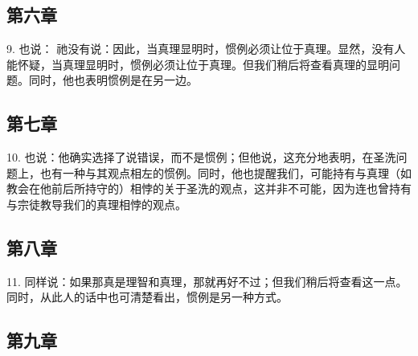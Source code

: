 
\subsection{第六章}

9. 也说：  祂没有说：因此，当真理显明时，惯例必须让位于真理。显然，没有人能怀疑，当真理显明时，惯例必须让位于真理。但我们稍后将查看真理的显明问题。同时，他也表明惯例是在另一边。\par


\subsection{第七章}

10. 也说：他确实选择了说错误，而不是惯例；但他说，这充分地表明，在圣洗问题上，也有一种与其观点相左的惯例。同时，他也提醒我们，可能持有与真理（如教会在他前后所持守的）相悖的关于圣洗的观点，这并非不可能，因为连也曾持有与宗徒教导我们的真理相悖的观点。\par


\subsection{第八章}

11. 同样说：如果那真是理智和真理，那就再好不过；但我们稍后将查看这一点。同时，从此人的话中也可清楚看出，惯例是另一种方式。\par


\subsection{第九章}

